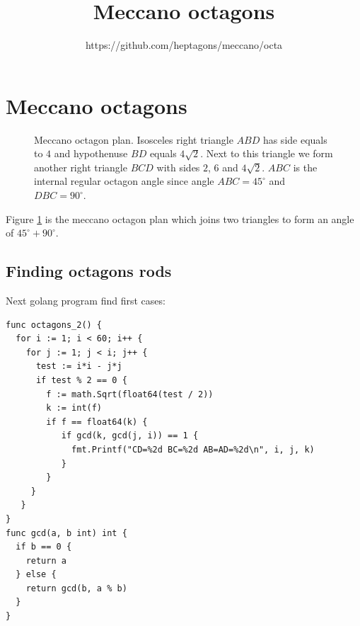 \documentclass[11pt]{article}
\title{\textbf{Meccano octagons}}
\author{https://github.com/heptagons/meccano/octa}
\date{}
\begin{document}
\maketitle

\section{Meccano octagons}

\begin{figure}
\centering
{}
\caption{Meccano octagon plan. Isosceles right triangle $ABD$ has side equals to $4$ and hypothenuse $BD$ equals $4\sqrt{2}$. Next to this triangle we form another right triangle $BCD$ with sides $2$, $6$ and $4\sqrt{2}$. $ABC$ is the internal regular octagon angle since angle $ABC=45^{\circ}$ and $DBC=90^{\circ}$.
}
\label{fig:1}
\end{figure}

Figure \ref{fig:1} is the meccano octagon plan which joins two triangles to form an angle of $45^{\circ} + 90^{\circ}$.

\subsection{Finding octagons rods}

Next golang program find first cases:

\begin{lstlisting}
func octagons_2() {
  for i := 1; i < 60; i++ {
    for j := 1; j < i; j++ {
      test := i*i - j*j
      if test % 2 == 0 {
        f := math.Sqrt(float64(test / 2))
        k := int(f)
        if f == float64(k) {
           if gcd(k, gcd(j, i)) == 1 {
             fmt.Printf("CD=%2d BC=%2d AB=AD=%2d\n", i, j, k)
           }
        }
     }
   }
}
func gcd(a, b int) int {
  if b == 0 {
    return a
  } else {
    return gcd(b, a % b)
  }
}
\end{lstlisting}
\end{document}
